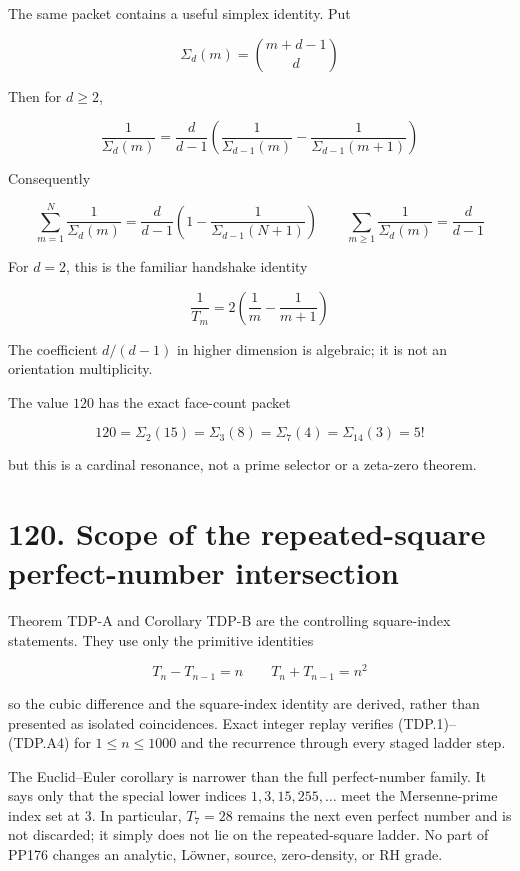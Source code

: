 \documentclass[
  11pt,
]{book}
\begin{document}
The same packet contains a useful simplex identity. Put

\[
\Sigma_d(m)=\binom{m+d-1}{d}
\]

Then for \(d\ge2\),

\[
\boxed{
\frac1{\Sigma_d(m)}
=\frac d{d-1}
\left(
\frac1{\Sigma_{d-1}(m)}-
\frac1{\Sigma_{d-1}(m+1)}
\right)}
\tag{76.7}
\]

Consequently

\[
\boxed{
\sum_{m=1}^{N}\frac1{\Sigma_d(m)}
=\frac d{d-1}
\left(1-\frac1{\Sigma_{d-1}(N+1)}\right)
\qquad
\sum_{m\ge1}\frac1{\Sigma_d(m)}=\frac d{d-1}}
\tag{76.8}
\]

For \(d=2\), this is the familiar handshake identity

\[
\frac1{T_m}=2\left(\frac1m-\frac1{m+1}\right)
\]

The coefficient \(d/(d-1)\) in higher dimension is algebraic; it is not
an orientation multiplicity.

The value \(120\) has the exact face-count packet

\[
120=\Sigma_2(15)=\Sigma_3(8)=\Sigma_7(4)=\Sigma_{14}(3)=5!
\tag{76.9}
\]

but this is a cardinal resonance, not a prime selector or a zeta-zero
theorem.

\section{120. Scope of the repeated-square perfect-number
intersection}\label{scope-of-the-repeated-square-perfect-number-intersection}

Theorem TDP-A and Corollary TDP-B are the controlling square-index
statements. They use only the primitive identities

\[
T_n-T_{n-1}=n
\qquad
T_n+T_{n-1}=n^2
\]

so the cubic difference and the square-index identity are derived,
rather than presented as isolated coincidences. Exact integer replay
verifies (TDP.1)--(TDP.A4) for \(1\le n\le1000\) and the recurrence
through every staged ladder step.

The Euclid--Euler corollary is narrower than the full perfect-number
family. It says only that the special lower indices
\(1,3,15,255,\ldots\) meet the Mersenne-prime index set at \(3\). In
particular, \(T_7=28\) remains the next even perfect number and is not
discarded; it simply does not lie on the repeated-square ladder. No part
of PP176 changes an analytic, Löwner, source, zero-density, or RH grade.
\end{document}
